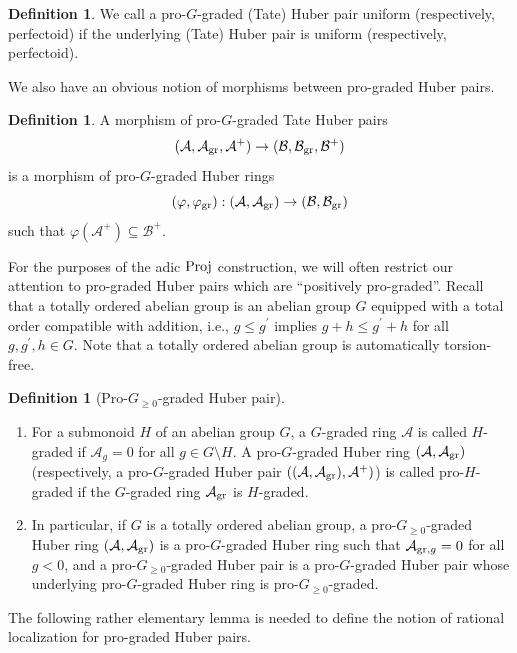 \documentclass[12pt,twoside,a4paper]{article}
\theoremstyle{definition}
\newtheorem{mydef}[thm]{Definition}
\theoremstyle{remark}
\newcommand\gr{{\rm gr}}
\newcommand\Proj{{\rm Proj}}
\begin{document}
\begin{mydef}We call a pro-$G$-graded (Tate) Huber pair uniform (respectively, perfectoid) if the underlying (Tate) Huber pair is uniform (respectively, perfectoid).\end{mydef}
We also have an obvious notion of morphisms between pro-graded Huber pairs. 
\begin{mydef}\label{Morphisms of pro-graded Huber pairs}A morphism of pro-$G$-graded Tate Huber pairs \begin{equation*}(\mathcal{A}, \mathcal{A}_{\gr}, \mathcal{A}^{+})\to (\mathcal{B}, \mathcal{B}_{\gr}, \mathcal{B}^{+})\end{equation*}is a morphism of pro-$G$-graded Huber rings \begin{equation*}(\varphi, \varphi_{\gr}): (\mathcal{A}, \mathcal{A}_{\gr})\to (\mathcal{B}, \mathcal{B}_{\gr})\end{equation*}such that $\varphi(\mathcal{A}^{+})\subseteq \mathcal{B}^{+}$. \end{mydef}
For the purposes of the adic $\Proj$ construction, we will often restrict our attention to pro-graded Huber pairs which are ``positively pro-graded''. Recall that a totally ordered abelian group is an abelian group $G$ equipped with a total order compatible with addition, i.e., $g\leq g^{\prime}$ implies $g+h\leq g^{\prime}+h$ for all $g, g^{\prime}, h\in G$. Note that a totally ordered abelian group is automatically torsion-free.  
\begin{mydef}[Pro-$G_{\geq0}$-graded Huber pair]\begin{enumerate}[(1)]\item For a submonoid $H$ of an abelian group $G$, a $G$-graded ring $\mathcal{A}$ is called $H$-graded if $\mathcal{A}_{g}=0$ for all $g\in G\setminus H$. A pro-$G$-graded Huber ring $(\mathcal{A}, \mathcal{A}_{\gr})$ (respectively, a pro-$G$-graded Huber pair $((\mathcal{A}, \mathcal{A}_{\gr}), \mathcal{A}^{+})$) is called pro-$H$-graded if the $G$-graded ring $\mathcal{A}_{\gr}$ is $H$-graded. \item In particular, if $G$ is a totally ordered abelian group, a pro-$G_{\geq0}$-graded Huber ring $(\mathcal{A}, \mathcal{A}_{\gr})$ is a pro-$G$-graded Huber ring such that $\mathcal{A}_{\gr,g}=0$ for all $g<0$, and a pro-$G_{\geq0}$-graded Huber pair is a pro-$G$-graded Huber pair whose underlying pro-$G$-graded Huber ring is pro-$G_{\geq0}$-graded.\end{enumerate}\end{mydef}  
The following rather elementary lemma is needed to define the notion of rational localization for pro-graded Huber pairs.
\end{document}
